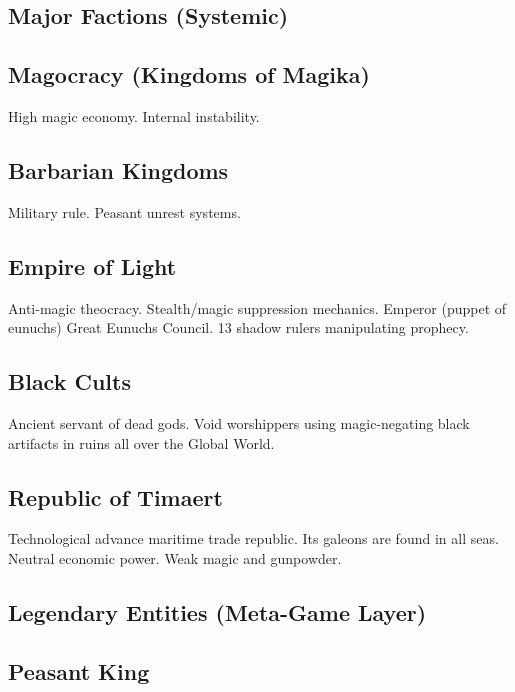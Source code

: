 \documentclass[a4paper,12pt]{article}
\begin{document}
\subsection{Major Factions (Systemic)}


\subsection{Magocracy (Kingdoms of Magika)}

High magic economy. Internal instability.

\subsection{Barbarian Kingdoms}

Military rule. Peasant unrest systems.

\subsection{Empire of Light}

Anti-magic theocracy. Stealth/magic suppression mechanics.
Emperor (puppet of eunuchs)
Great Eunuchs Council.
13 shadow rulers manipulating prophecy.

\subsection{Black Cults}

Ancient servant of dead gods.
Void worshippers using magic-negating black artifacts in ruins all over the Global World.

\subsection{Republic of Timaert}

Technological advance maritime trade republic. Its galeons are found in all seas. Neutral economic power. Weak magic and gunpowder.


\subsection{Legendary Entities (Meta-Game Layer)}

\subsection{Peasant King}
\end{document}
